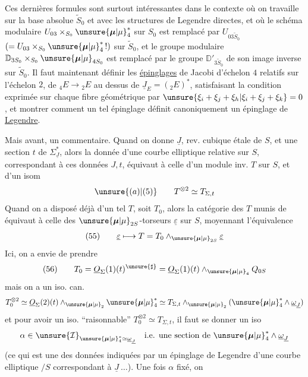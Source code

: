 Ces dernières formules sont surtout
intéressantes dans le contexte où on travaille 
sur la base absolue $\widetilde S_0$ et
avec les structures de Legendre directes,
et où le schéma modulaire $U_{03}\times_{S_0}\unsure{\boldsymbol{\mu}|\mu}_4^*$ sur
$S_0$ est remplacé par $U_{03\widetilde S_0}$
$(=U_{03}\times_{S_0}\unsure{\boldsymbol{\mu}|\mu}_4^*\,!)$
sur $\widetilde S_0$, et le groupe modulaire
$\mathbb{D}_{3S_0}\times_{S_0}\unsure{\boldsymbol{\mu}|\mu}_{4S_0}$ est remplacé par le
groupe $\mathbb{D}'_{3\widetilde S_0}$
de  son image inverse sur $\widetilde S_0$.
Il faut maintenant définir les
\uline{épinglages} de Jacobi d'échelon $4$ relatifs
sur l'échelon $2$, 
de ${}_4E\longrightarrow{}_2E$ au dessus de
$\underline{J}_E=({}_2E)^*$, satisfaisant la condition exprimée
 sur chaque fibre géométrique
par $\unsure{\xi_i+\xi_j+\xi_h|\xi_i+\xi_j+\xi_k}=0$, et montrer comment
un tel épinglage définit canoniquement
un épinglage de \uline{Legendre}.

Mais avant, un commentaire. Quand on
donne $\underline{J}$, rev. cubique étale de $S$, et une
section $t$ de $\Sigma_{\underline{J}}^*$, alors la donnée d'une
courbe elliptique relative sur $S$, correspondant à
ces données $J,t$, équivaut à celle d'un
module inv. $T$ sur $S$, et d'un isom 
\[
\unsure{(a)|(5)}\qquad T^{\otimes2}\simeq T_{\Sigma,t}
\]
Quand on a disposé déjà d'un tel $T$, soit
$T_0$, alors la catégorie des $T$  munis de  équivaut
à celle des $\unsure{\boldsymbol{\mu}|\mu}_{2S}$-torseurs $\underline{\varepsilon}$ sur $S$, moyennant
l'équivalence
\[
(55)\qquad \underline{\varepsilon}\longmapsto T=T_0\wedge_{\unsure{\boldsymbol{\mu}|\mu}_{2S}}\underline{\varepsilon}
\]
Ici, on a envie de prendre
\[
(56)\qquad T_0=\underline{O}_{\Sigma}(1)(t)^{\unsure{\sharp}}
=\underline{O}_{\Sigma}(1)(t)\wedge_{\unsure{\boldsymbol{\mu}|\mu}_4}Q_{0S}
\]
mais on a un iso. can.
\[
T_0^{\otimes2}\simeq\underline{O}_{\Sigma}(2)(t)\wedge_{\unsure{\boldsymbol{\mu}|\mu}_2}\unsure{\boldsymbol{\mu}|\mu}_4^*
\simeq T_{\Sigma,t}\wedge_{\unsure{\boldsymbol{\mu}|\mu}_2}(\unsure{\boldsymbol{\mu}|\mu}_4^*\wedge\underline{\omega}_{\underline{J}})
\]
et pour avoir un iso. ``raisonnable'' $T_0^{\otimes2}\simeq T_{\Sigma,t}$,
il faut se donner un  iso
\[
\alpha\in\unsure{\mathcal{I}}_{\unsure{\boldsymbol{\mu}|\mu}_4^*\simeq\underline{\omega}_{\underline J}}
\quad\text{i.e. une section de }\unsure{\boldsymbol{\mu}|\mu}_4^*\wedge\underline{\omega}_{\underline J}
\]
(ce qui est une des données indiquées par un
épinglage de Legendre d'une courbe elliptique $/S$
correspondant à $\underline{J}\ \ldots$). Une fois $\alpha$ fixé, on

